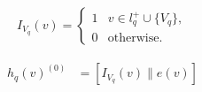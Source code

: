 {\begin{align}
	\label{eq:encoder:querynode}
	I_{V_q}(v) =
	\begin{cases}
		1 & {v \in l_q^{+} \cup \{V_q\}  },  \\
		0 & \text{otherwise}.
	\end{cases}
\end{align}



\begin{align}
    h_{q}(v)^{(0)} &= [ I_{V_q}(v) \| e(v) ] \label{eq:encoder:concate}
\end{align}
}


